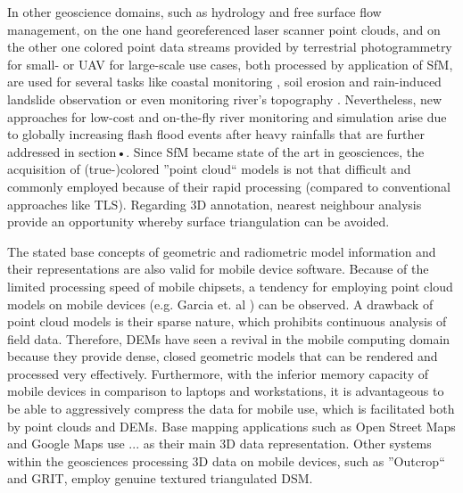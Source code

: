 \documentclass[review]{elsarticle}
\begin{document}
In other geoscience domains, such as hydrology and free surface flow management, on the one hand georeferenced laser scanner point clouds, and on the other one colored point data streams provided by terrestrial photogrammetry for small- or \gls{UAV} for large-scale use cases, both processed by application of \gls{SfM}, are used for several tasks like coastal monitoring \cite{Letortu2017, Medjkane2018}, soil erosion and rain-induced landslide observation or even monitoring river's topography \cite{Watanabe2016}. Nevertheless, new approaches for low-cost and on-the-fly river monitoring \cite{Kroehnert2017a} and simulation \cite{Leskens2015} arise due to globally increasing flash flood events after heavy rainfalls \cite{Mueller2011} that are further addressed in section{•}.
Since \gls{SfM} became state of the art in geosciences, the acquisition of (true-)colored ''point cloud`` models is not that difficult and commonly employed because of their rapid processing (compared to conventional approaches like \gls{TLS}). Regarding 3D annotation, nearest neighbour analysis provide an opportunity whereby surface triangulation can be avoided.








The stated base concepts of geometric and radiometric model information and their representations are also valid for mobile device software. Because of the limited processing speed of mobile chipsets, a tendency for employing point cloud models on mobile devices (e.g. Garcia et. al \cite{Garcia2015}) can be observed. A drawback of point cloud models is their sparse nature, which prohibits continuous analysis of field data. Therefore, \glspl{DEM} have seen a revival in the mobile computing domain because they provide dense, closed geometric models that can be rendered and processed very effectively. Furthermore, with the inferior memory capacity of mobile devices in comparison to laptops and workstations, it is advantageous to be able to aggressively compress the data for mobile use, which is facilitated both by point clouds and \glspl{DEM}. Base mapping applications such as Open Street Maps and Google Maps use ... as their main 3D data representation. Other systems within the geosciences processing 3D data on mobile devices, such as ''Outcrop`` and \gls{GRIT}, employ genuine textured triangulated \gls{DSM}.
\end{document}
